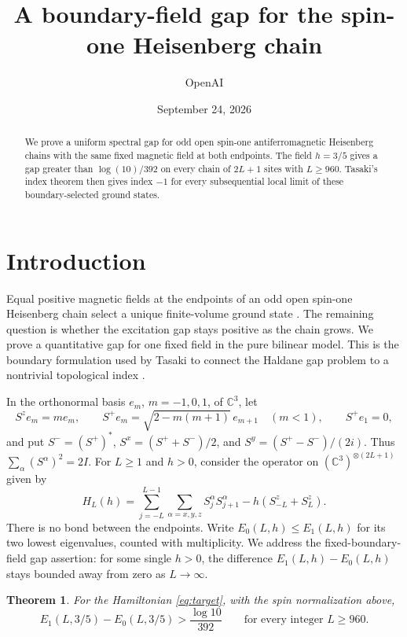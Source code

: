 \documentclass[11pt]{article}
\title{A boundary-field gap for the spin-one Heisenberg chain}
\author{OpenAI}
\date{September 24, 2026}
\newcommand{\Id}{I}
\newcommand{\C}{\mathbb C}
\newtheorem{theorem}{Theorem}[section]
\theoremstyle{remark}
\numberwithin{equation}{section}
\begin{document}
\maketitle
\begin{abstract}
We prove a uniform spectral gap for odd open spin-one antiferromagnetic
Heisenberg chains with the same fixed magnetic field at both endpoints.
The field $h=3/5$ gives a gap greater than $\log(10)/392$ on every chain
of $2L+1$ sites with $L\ge960$. Tasaki's index theorem then gives index $-1$
for every subsequential local limit of these boundary-selected ground states.
\end{abstract}

\section{Introduction}
Equal positive magnetic fields at the endpoints of an odd open spin-one
Heisenberg chain select a unique finite-volume ground state
\cite[Lemma 1]{Tasaki2025}. The remaining question is whether the
excitation gap stays positive as the chain grows. We prove a
quantitative gap for one fixed field in the pure bilinear model.
This is the boundary formulation used by Tasaki to connect the
Haldane gap problem to a nontrivial topological index \cite{Tasaki2025}.

In the orthonormal basis $e_m$, $m=-1,0,1$, of $\C^3$, let
\[
 S^ze_m=me_m,\qquad
 S^+e_m=\sqrt{2-m(m+1)}\,e_{m+1}\quad(m<1),\qquad S^+e_1=0,
\]
and put $S^-=(S^+)^*$, $S^x=(S^++S^-)/2$, and
$S^y=(S^+-S^-)/(2i)$. Thus $\sum_\alpha(S^\alpha)^2=2\Id$.
For $L\ge1$ and $h>0$, consider the operator on
$(\C^3)^{\otimes(2L+1)}$ given by
\begin{equation}\label{eq:target}
 H_L(h)=\sum_{j=-L}^{L-1}\sum_{\alpha=x,y,z}S_j^\alpha S_{j+1}^\alpha
       -h(S_{-L}^z+S_L^z).
\end{equation}
There is no bond between the endpoints. Write $E_0(L,h)\le E_1(L,h)$
for its two lowest eigenvalues, counted with multiplicity. We address
the fixed-boundary-field gap assertion: for some single $h>0$, the
difference $E_1(L,h)-E_0(L,h)$ stays bounded away from zero as
$L\to\infty$.

\begin{theorem}\label{thm:main}
For the Hamiltonian \eqref{eq:target}, with the spin normalization above,
\[
 E_1(L,3/5)-E_0(L,3/5)>\frac{\log 10}{392}
 \qquad\text{for every integer }L\ge960.
\]
\end{theorem}


\end{document}

